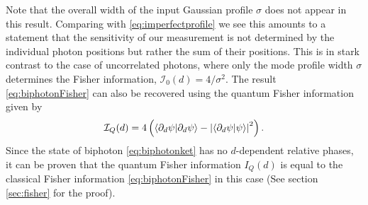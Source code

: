 Note that the overall width of the input Gaussian profile $\sigma$ does not appear in this result.
Comparing with \eqref{eq:imperfectprofile} we see this amounts to a statement that the sensitivity of our measurement is not determined by the individual photon positions but rather the sum of their positions.  
This is in stark contrast to the case of uncorrelated photons, where only the mode profile width $\sigma$ determines the Fisher information, $\mathcal{I}_0(d) = 4/\sigma^2$.
The result \eqref{eq:biphotonFisher} can also be recovered using the quantum Fisher information given by \cite{Braunstein1996}
\begin{align}
	\mathcal{I}_Q(d) = 4\left(\langle \partial_d \psi \vert \partial_d \psi \rangle - \left|\langle \partial_d \psi \vert \psi \rangle\right|^2\right).
\end{align}
Since the state of biphoton \eqref{eq:biphotonket} has no $d$-dependent relative phases, it can be proven that the quantum Fisher information $I_Q(d)$ is equal to the classical Fisher information \eqref{eq:biphotonFisher} in this case (See section \ref{sec:fisher} for the proof).

